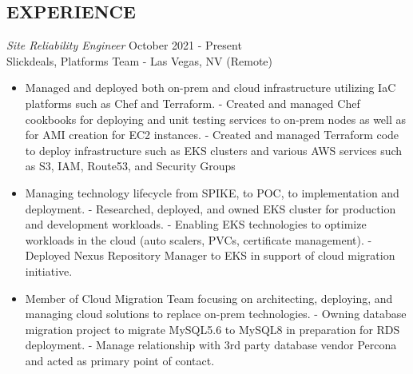 \documentclass[line,margin]{res}
\begin{document}
\address{Phone: +1.650.772.1711 $|$ Email: alan.huang.250r@gmail.com}

\begin{resume}


\section{EXPERIENCE}
\vspace{25px}
\begin{adjustwidth}{-115pt}{0pt}
	{\sl Site Reliability Engineer}
		\hfill October 2021 - Present\\
		Slickdeals, Platforms Team - Las Vegas, NV (Remote)
		\begin{itemize}
			\item Managed and deployed both on-prem and cloud infrastructure utilizing IaC platforms such as Chef and Terraform.
				\subitem - Created and managed Chef cookbooks for deploying and unit testing services to on-prem nodes as well as for AMI creation for EC2 instances.
				\subitem - Created and managed Terraform code to deploy infrastructure such as EKS clusters and various AWS services such as S3, IAM, Route53, and Security Groups
			\item Managing technology lifecycle from SPIKE, to POC, to implementation and deployment.
				\subitem - Researched, deployed, and owned EKS cluster for production and development workloads.
				\subitem - Enabling EKS technologies to optimize workloads in the cloud (auto scalers, PVCs, certificate management).
				\subitem - Deployed Nexus Repository Manager to EKS in support of cloud migration initiative.
			\item Member of Cloud Migration Team focusing on architecting, deploying, and managing cloud solutions to replace on-prem technologies.
				\subitem - Owning database migration project to migrate MySQL5.6 to MySQL8 in preparation for RDS deployment.
				\subitem - Manage relationship with 3rd party database vendor Percona and acted as primary point of contact.


\end{itemize}
\end{adjustwidth}
\end{resume}
\end{document}
